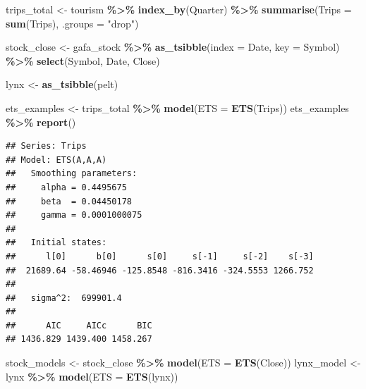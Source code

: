 \documentclass[
  11pt,
]{article}
\newenvironment{Shaded}{\begin{snugshade}}{\end{snugshade}}
\newcommand{\AttributeTok}[1]{\textcolor[rgb]{0.13,0.29,0.53}{#1}}
\newcommand{\FunctionTok}[1]{\textcolor[rgb]{0.13,0.29,0.53}{\textbf{#1}}}
\newcommand{\NormalTok}[1]{#1}
\newcommand{\OtherTok}[1]{\textcolor[rgb]{0.56,0.35,0.01}{#1}}
\newcommand{\SpecialCharTok}[1]{\textcolor[rgb]{0.81,0.36,0.00}{\textbf{#1}}}
\newcommand{\StringTok}[1]{\textcolor[rgb]{0.31,0.60,0.02}{#1}}
\begin{document}
\begin{Shaded}
\begin{Highlighting}[]
\NormalTok{trips\_total }\OtherTok{\textless{}{-}}\NormalTok{ tourism }\SpecialCharTok{\%\textgreater{}\%}
  \FunctionTok{index\_by}\NormalTok{(Quarter) }\SpecialCharTok{\%\textgreater{}\%}
  \FunctionTok{summarise}\NormalTok{(}\AttributeTok{Trips =} \FunctionTok{sum}\NormalTok{(Trips), }\AttributeTok{.groups =} \StringTok{"drop"}\NormalTok{)}

\NormalTok{stock\_close }\OtherTok{\textless{}{-}}\NormalTok{ gafa\_stock }\SpecialCharTok{\%\textgreater{}\%}
  \FunctionTok{as\_tsibble}\NormalTok{(}\AttributeTok{index =}\NormalTok{ Date, }\AttributeTok{key =}\NormalTok{ Symbol) }\SpecialCharTok{\%\textgreater{}\%}
  \FunctionTok{select}\NormalTok{(Symbol, Date, Close)}

\NormalTok{lynx }\OtherTok{\textless{}{-}} \FunctionTok{as\_tsibble}\NormalTok{(pelt) }

\NormalTok{ets\_examples }\OtherTok{\textless{}{-}}\NormalTok{ trips\_total }\SpecialCharTok{\%\textgreater{}\%} \FunctionTok{model}\NormalTok{(}\AttributeTok{ETS =} \FunctionTok{ETS}\NormalTok{(Trips))}
\NormalTok{ets\_examples }\SpecialCharTok{\%\textgreater{}\%} \FunctionTok{report}\NormalTok{()}
\end{Highlighting}
\end{Shaded}

\begin{verbatim}
## Series: Trips 
## Model: ETS(A,A,A) 
##   Smoothing parameters:
##     alpha = 0.4495675 
##     beta  = 0.04450178 
##     gamma = 0.0001000075 
## 
##   Initial states:
##      l[0]      b[0]      s[0]     s[-1]     s[-2]    s[-3]
##  21689.64 -58.46946 -125.8548 -816.3416 -324.5553 1266.752
## 
##   sigma^2:  699901.4
## 
##      AIC     AICc      BIC 
## 1436.829 1439.400 1458.267
\end{verbatim}

\begin{Shaded}
\begin{Highlighting}[]
\NormalTok{stock\_models }\OtherTok{\textless{}{-}}\NormalTok{ stock\_close }\SpecialCharTok{\%\textgreater{}\%} \FunctionTok{model}\NormalTok{(}\AttributeTok{ETS =} \FunctionTok{ETS}\NormalTok{(Close))}
\NormalTok{lynx\_model }\OtherTok{\textless{}{-}}\NormalTok{ lynx }\SpecialCharTok{\%\textgreater{}\%} \FunctionTok{model}\NormalTok{(}\AttributeTok{ETS =} \FunctionTok{ETS}\NormalTok{(lynx))}
\end{Highlighting}
\end{Shaded}
\end{document}
